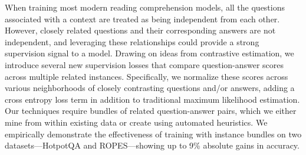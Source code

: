 When training most modern reading comprehension models, all the questions associated with a context are treated as being independent from each other. However, closely related questions and their corresponding answers are not independent, and leveraging these relationships could provide a strong supervision signal to a model.  Drawing on ideas from contrastive estimation, we introduce several new supervision losses that compare question-answer scores across multiple related instances.  Specifically, we normalize these scores across various neighborhoods of closely contrasting questions and/or answers, adding a cross entropy loss term in addition to traditional maximum likelihood estimation.  Our techniques require bundles of related question-answer pairs, which we either mine from within existing data or create using automated heuristics.   We empirically demonstrate the effectiveness of training with instance bundles on two datasets---HotpotQA and ROPES---showing up to 9\% absolute gains in accuracy.
